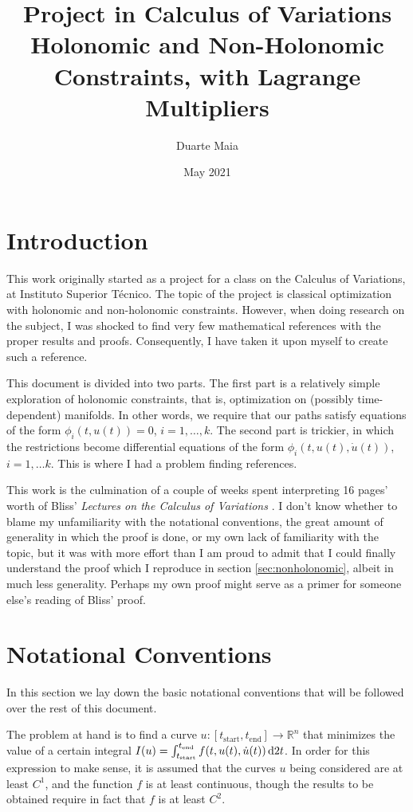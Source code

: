 \documentclass{article}
\title{Project in Calculus of Variations\\
\large Holonomic and Non-Holonomic Constraints, with Lagrange Multipliers}
\author{Duarte Maia}
\date{May 2021}
\theoremstyle{nonumberplain}
\theoremstyle{nonumberplain}
\newcommand{\R}{\mathbb{R}}
\newcommand{\tstart}{\mathrm{start}}
\newcommand{\tend}{\mathrm{end}}
\begin{document}
\maketitle

\section{Introduction}

This work originally started as a project for a class on the Calculus of Variations, at Instituto Superior Técnico. The topic of the project is classical optimization with holonomic and non-holonomic constraints. However, when doing research on the subject, I was shocked to find very few mathematical references with the proper results and proofs. Consequently, I have taken it upon myself to create such a reference.

This document is divided into two parts. The first part is a relatively simple exploration of holonomic constraints, that is, optimization on (possibly time-dependent) manifolds. In other words, we require that our paths satisfy equations of the form $\phi_i(t, u(t)) = 0$, $i = 1, \dots, k$. The second part is trickier, in which the restrictions become differential equations of the form $\phi_i(t,u(t), \dot u(t))$, $i = 1, \dots k$. This is where I had a problem finding references.

This work is the culmination of a couple of weeks spent interpreting 16 pages' worth of Bliss' \textit{Lectures on the Calculus of Variations} \cite[pp.~187-202]{bliss}. I don't know whether to blame my unfamiliarity with the notational conventions, the great amount of generality in which the proof is done, or my own lack of familiarity with the topic, but it was with more effort than I am proud to admit that I could finally understand the proof which I reproduce in section \ref{sec:nonholonomic}, albeit in much less generality. Perhaps my own proof might serve as a primer for someone else's reading of Bliss' proof.

\section{Notational Conventions}

In this section we lay down the basic notational conventions that will be followed over the rest of this document.

The problem at hand is to find a curve $u \colon [t_\tstart, t_\tend] \to \R^n$ that minimizes the value of a certain integral $I(u) = \int_{t_\tstart}^{t_\tend} f(t, u(t), \dot u(t)) \dl2 t$. In order for this expression to make sense, it is assumed that the curves $u$ being considered are at least $C^1$, and the function $f$ is at least continuous, though the results to be obtained require in fact that $f$ is at least $C^2$.
\end{document}
